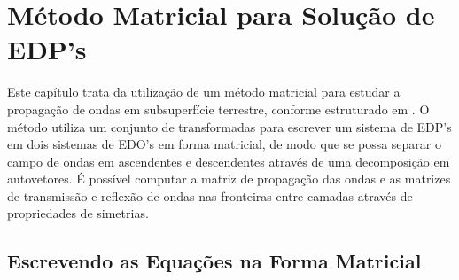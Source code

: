 \chapter{M\'etodo Matricial para Solu\c{c}\~ao de EDP's}
Este cap\'itulo trata da utiliza\c{c}\~ao de um m\'etodo matricial para estudar a propaga\c{c}\~ao de ondas em subsuperf\'icie terrestre, conforme estruturado em \cite{Ursin-1983}. O m\'etodo utiliza um conjunto de transformadas para escrever um sistema de EDP's em dois sistemas de EDO's em forma matricial, de modo que se possa separar o campo de ondas em ascendentes e descendentes atrav\'es de uma decomposi\c{c}\~ao em autovetores. \'E poss\'ivel computar a matriz de propaga\c{c}\~ao das ondas e as matrizes de transmiss\~ao e reflex\~ao de ondas nas fronteiras entre camadas atrav\'es de propriedades de simetrias.

\section{Escrevendo as Equa\c{c}\~oes na Forma Matricial}

